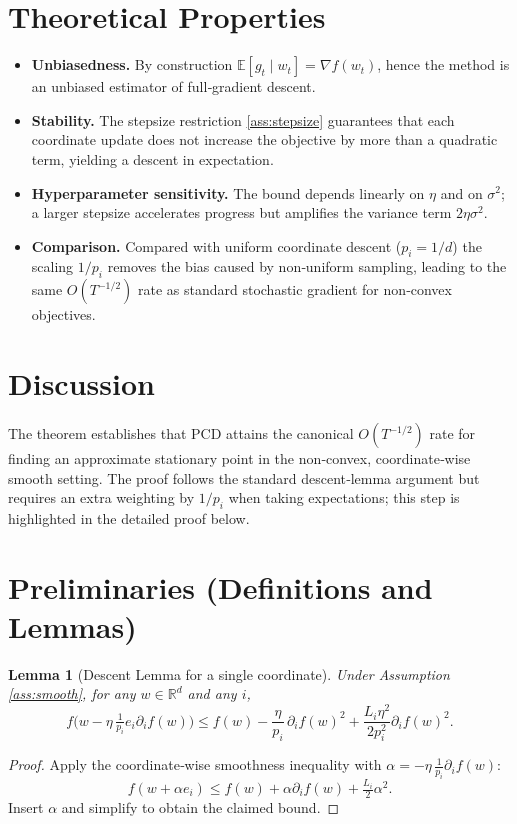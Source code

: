 \documentclass[11pt]{article}
\newtheorem{lemma}{Lemma}
\newcommand{\E}{\mathbb{E}}
\newcommand{\R}{\mathbb{R}}
\newcommand{\grad}{\nabla}
\begin{document}
\section*{Theoretical Properties}
\begin{itemize}[leftmargin=*]
\item \textbf{Unbiasedness.} By construction $\E[g_t\mid w_t]=\grad f(w_t)$, hence the method is an unbiased estimator of full‑gradient descent.
\item \textbf{Stability.} The stepsize restriction \ref{ass:stepsize} guarantees that each coordinate update does not increase the objective by more than a quadratic term, yielding a descent in expectation.
\item \textbf{Hyperparameter sensitivity.} The bound depends linearly on $\eta$ and on $\sigma^{2}$; a larger stepsize accelerates progress but amplifies the variance term $2\eta\sigma^{2}$.
\item \textbf{Comparison.} Compared with uniform coordinate descent ($p_i=1/d$) the scaling $1/p_i$ removes the bias caused by non‑uniform sampling, leading to the same $O(T^{-1/2})$ rate as standard stochastic gradient for non‑convex objectives.
\end{itemize}

\section*{Discussion}
The theorem establishes that PCD attains the canonical $O(T^{-1/2})$ rate for finding an approximate stationary point in the non‑convex, coordinate‑wise smooth setting. The proof follows the standard descent‑lemma argument but requires an extra weighting by $1/p_i$ when taking expectations; this step is highlighted in the detailed proof below.

\newpage
\section*{Preliminaries (Definitions and Lemmas)}
\begin{lemma}[Descent Lemma for a single coordinate]\label{lem:descent}
Under Assumption \ref{ass:smooth}, for any $w\in\R^{d}$ and any $i$,
\[
f\bigl(w- \eta\,\tfrac{1}{p_i}e_i\partial_i f(w)\bigr)
\le f(w)-\frac{\eta}{p_i}\,\partial_i f(w)^{2}
+\frac{L_i\eta^{2}}{2p_i^{2}}\partial_i f(w)^{2}.
\]
\end{lemma}
\begin{proof}
Apply the coordinate‑wise smoothness inequality with $\alpha=-\eta\,\frac{1}{p_i}\partial_i f(w)$:
\[
f(w+\alpha e_i)\le f(w)+\alpha\partial_i f(w)+\tfrac{L_i}{2}\alpha^{2}.
\]
Insert $\alpha$ and simplify to obtain the claimed bound. \hfill\qedsymbol
\end{proof}
\end{document}
